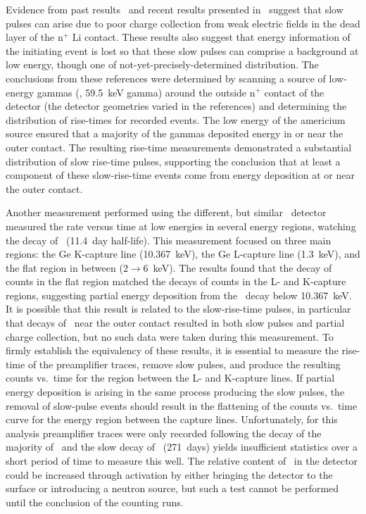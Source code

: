 Evidence from past results~\cite{Strauss196780,Sakai:1971ff} and recent results presented in~\cite{Aalseth:2010aa} suggest that slow pulses can arise due to poor charge collection from weak electric fields in the dead layer of the n$^{+}$ Li contact.  These results also suggest that energy information of the initiating event is lost so that these slow pulses can comprise a background at low energy, though one of not-yet-precisely-determined distribution.  The conclusions from these references were determined by scanning a source of low-energy gammas (\amtwofourone, 59.5~keV gamma) around the outside n$^{+}$ contact of the detector (the detector geometries varied in the references) and determining the distribution of rise-times for recorded events.  The low energy of the americium source ensured that a majority of the gammas deposited energy in or near the outer contact.  The resulting rise-time measurements demonstrated a substantial distribution of slow rise-time pulses, supporting the conclusion that at least a component of these slow-rise-time events come from energy deposition at or near the outer contact.  

Another measurement performed using the different, but similar \ppc~detector~\cite{Barbeau:2009fk} measured the rate versus time at low energies in several energy regions, watching the decay of \gersevenone~(11.4~day half-life).  This measurement focused on three main regions: the Ge K-capture line (10.367~keV), the Ge L-capture line (1.3~keV), and the flat region in between ($2\to6$~keV).  The results found that the decay of counts in the flat region matched the decays of counts in the L- and K-capture regions, suggesting partial energy deposition from the \gersevenone~decay below 10.367~keV.  It is possible that this result is related to the slow-rise-time pulses, in particular that decays of \gersevenone~near the outer contact resulted in both slow pulses and partial charge collection, but no such data were taken during this measurement.  To firmly establish the equivalency of these results, it is essential to measure the rise-time of the preamplifier traces, remove slow pulses, and produce the resulting counts vs.~time for the region between the L- and K-capture lines.  If partial energy deposition is arising in the same process producing the slow pulses, the removal of slow-pulse events should result in the flattening of the counts vs.~time curve for the energy region between the capture lines.  Unfortunately, for this analysis preamplifier traces were only recorded following the decay of the majority of \gersevenone~and the slow decay of \gersixeight~(271~days) yields insufficient statistics over a short period of time to measure this well.  The relative content of \gersevenone~in the detector could be increased through activation by either bringing the detector to the surface or introducing a neutron source, but such a test cannot be performed until the conclusion of the counting runs.  


